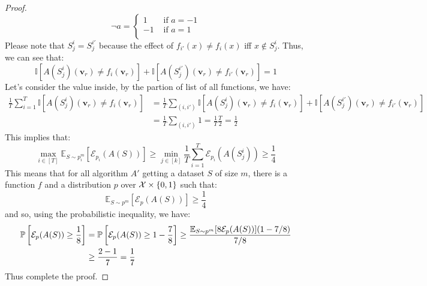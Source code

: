 \begin{proof}
    \begin{equation*}
        \neg a = \begin{cases}
            1 & \text{ if } a = -1 \\
            -1 & \text{ if } a = 1 \\
        \end{cases}
    \end{equation*}
    Please note that $S^{i}_j = S^{i'}_j$ because the effect of $f_{i'}(x) \ne f_i(x)$ iff $x\not\in S^i_j$. Thus, we can see that:
    \begin{equation*}
        \mathbb{I}[A(S^i_j)(\boldsymbol v_r) \ne f_i(\boldsymbol v_r)] +  \mathbb{I}[A(S^{i'}_j)(\boldsymbol v_r) \ne f_{i'}(\boldsymbol v_r)] = 1
    \end{equation*}
    Let's consider the value inside, by the partion of list of all functions, we have:
    \begin{equation*}
    \begin{aligned}
        \frac{1}{T}\sum^T_{i=1} \mathbb{I}[A(S^i_j)(\boldsymbol v_r) \ne f_i(\boldsymbol v_r)] &= \frac{1}{T}\sum_{(i,i')} \mathbb{I}[A(S^i_j)(\boldsymbol v_r) \ne f_i(\boldsymbol v_r)] +  \mathbb{I}[A(S^{i'}_j)(\boldsymbol v_r) \ne f_{i'}(\boldsymbol v_r)] \\
        &= \frac{1}{T}\sum_{(i,i')} 1 = \frac{1}{T}\frac{T}{2} = \frac{1}{2}
    \end{aligned}
    \end{equation*}
    This implies that:
    \begin{equation*}
        \max_{i \in [T]} \mathbb{E}_{S \sim p_i^m}[\mathcal{E}_{p_i}(A(S))] \ge \min_{j\in[k]} \frac{1}{T}\sum^T_{i=1} \mathcal{E}_{p_i}(A(S^i_j)) \ge \frac{1}{4}        
    \end{equation*}
    This means that for all algorithm $A'$ getting a dataset $S$ of size $m$, there is a function $f$ and a distribution $p$ over $\mathcal{X}\times \left\{ 0, 1 \right\}$ such that:
    \begin{equation*}
        \mathbb{E}_{S \sim p^m}[\mathcal{E}_{p}(A(S))] \ge \frac{1}{4}
    \end{equation*}
    and so, using the probabilistic inequality, we have:
    \begin{equation*}
    \begin{aligned}
        \mathbb{P}\left[ \mathcal{E}_{p}(A(S)) \ge \frac{1}{8} \right] &= \mathbb{P}\left[ \mathcal{E}_{p}(A(S)) \ge 1 - \frac{7}{8} \right] \ge \frac{\mathbb{E}_{S \sim p^m}[8\mathcal{E}_{p}(A(S))](1-7/8)}{7/8} \\
        &\ge \frac{2- 1}{7} = \frac{1}{7}
    \end{aligned}
    \end{equation*}
    Thus complete the proof.
\end{proof}

